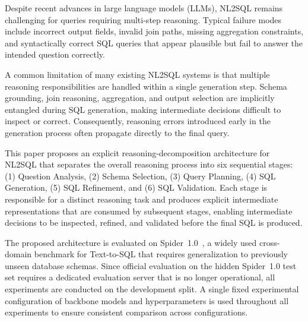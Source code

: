 \documentclass{svproc}
\begin{document}
Despite recent advances in large language models (LLMs), NL2SQL remains challenging for queries requiring multi-step reasoning. Typical failure modes include incorrect output fields, invalid join paths, missing aggregation constraints, and syntactically correct SQL queries that appear plausible but fail to answer the intended question correctly. 

A common limitation of many existing NL2SQL systems is that multiple reasoning responsibilities are handled within a single generation step. Schema grounding, join reasoning, aggregation, and output selection are implicitly entangled during SQL generation, making intermediate decisions difficult to inspect or correct. Consequently, reasoning errors introduced early in the generation process often propagate directly to the final query.


This paper proposes an explicit reasoning-decomposition architecture for NL2SQL that separates the overall reasoning process into six sequential stages: (1) Question Analysis, (2) Schema Selection, (3) Query Planning, (4) SQL Generation, (5) SQL Refinement, and (6) SQL Validation. Each stage is responsible for a distinct reasoning task and produces explicit intermediate representations that are consumed by subsequent stages, enabling intermediate decisions to be inspected, refined, and validated before the final SQL is produced.



The proposed architecture is evaluated on Spider~1.0~\cite{yu2018spider}, a widely used cross-domain benchmark for Text-to-SQL that requires generalization to previously unseen database schemas. Since official evaluation on the hidden Spider~1.0 test set requires a dedicated evaluation server that is no longer operational, all experiments are conducted on the development split. A single fixed experimental configuration of backbone models and hyperparameters is used throughout all experiments to ensure consistent comparison across configurations.
\end{document}
